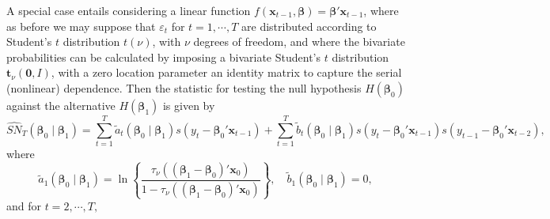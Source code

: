 \documentclass[harvard,11pt]{article}
\begin{document}
A special case entails considering a linear function $f(\bm{x}_{t-1},\bm{\beta})=\bm{\beta}'\bm{x}_{t-1}$, where as before we may suppose that $\varepsilon_{t}$ for $t=1,\cdots,T$  are distributed according to Student's $t$ distribution $t(\nu)$, with $\nu$ degrees of freedom, and where the bivariate probabilities can be calculated by imposing a bivariate Student's $t$ distribution $\bm{t}_\nu(\bm{0},I)$, with a zero location parameter an identity matrix to capture the serial (nonlinear) dependence. Then the statistic for testing the null hypothesis $H(\bm{\beta}_0)$ against the alternative $H(\bm{\beta}_1)$ is given by
\begin{equation*}
\widehat{SN}_{T}(\bm{\beta}_{0}\mid\bm{\beta}_{1})=\sum\limits_{t=1}^{T}\tilde{a}%
_{t}(\bm{\beta}_{0}\mid\bm{\beta}_{1})s(y_{t}-\bm{\beta}_0'\bm{x}_{t-1})+\sum\limits_{t=1}^{T}\tilde{b}_{t}(\bm{\beta}_0\mid\bm{\beta}_{1})%
s(y_{t}-\bm{\beta}_0'\bm{x}_{t-1})s(y_{t-1}-\bm{\beta}_0'\bm{x}_{t-2}),
\end{equation*}%
where%
\begin{equation*}
\tilde{a}_{1}(\bm{\beta}_{0}\mid\bm{\beta}_{1})=\ln \left\{ \frac{\tau_{\nu}\left(\left(\bm{\beta}_1-\bm{\beta}_0\right)'\bm{x}_0\right) }{1-\tau_{\nu}\left(\left(\bm{\beta}_1-\bm{\beta}_0\right)'\bm{x}_0\right) }\right\} ,\quad%
\tilde{b}_{1}(\bm{\beta}_{0}\mid\bm{\beta}_{1})=0,
\end{equation*}%
and for $t=2,\cdots,T,$%
\end{document}
